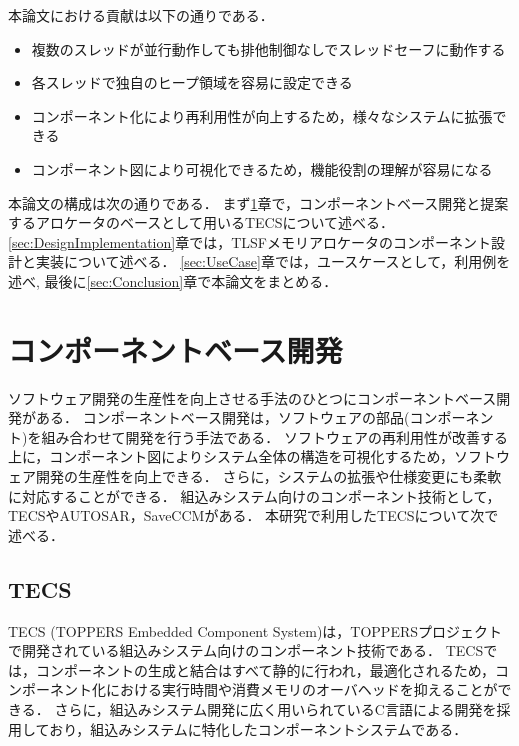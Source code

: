 \documentclass[submit,techrep]{ipsj_v2/UTF8/ipsj}
\begin{document}
本論文における貢献は以下の通りである．
\begin{itemize}
    \item 複数のスレッドが並行動作しても排他制御なしでスレッドセーフに動作する
    \item 各スレッドで独自のヒープ領域を容易に設定できる
    \item コンポーネント化により再利用性が向上するため，様々なシステムに拡張できる
    \item コンポーネント図により可視化できるため，機能役割の理解が容易になる
\end{itemize}

本論文の構成は次の通りである．
まず\ref{sec:ComponentBasedDevelopment}章で，コンポーネントベース開発と提案するアロケータのベースとして用いるTECSについて述べる．
\ref{sec:DesignImplementation}章では，TLSFメモリアロケータのコンポーネント設計と実装について述べる．
\ref{sec:UseCase}章では，ユースケースとして，利用例を述べ, 最後に\ref{sec:Conclusion}章で本論文をまとめる．

\section{コンポーネントベース開発}
\label{sec:ComponentBasedDevelopment}

ソフトウェア開発の生産性を向上させる手法のひとつにコンポーネントベース開発がある\cite{par:Crnkovic}\cite{par:CBD}．
コンポーネントベース開発は，ソフトウェアの部品(コンポーネント)を組み合わせて開発を行う手法である．
ソフトウェアの再利用性が改善する上に，コンポーネント図によりシステム全体の構造を可視化するため，ソフトウェア開発の生産性を向上できる．
さらに，システムの拡張や仕様変更にも柔軟に対応することができる．
組込みシステム向けのコンポーネント技術として，TECSやAUTOSAR\cite{url:AUTOSAR}，SaveCCM\cite{par:SaveCCM}がある．
本研究で利用したTECSについて次で述べる．

\subsection{TECS}

TECS (TOPPERS Embedded Component System)は，TOPPERSプロジェクト\cite{url:TOPPERS}で開発されている組込みシステム向けのコンポーネント技術である．
TECSでは，コンポーネントの生成と結合はすべて静的に行われ，最適化されるため，コンポーネント化における実行時間や消費メモリのオーバヘッドを抑えることができる．
さらに，組込みシステム開発に広く用いられているC言語による開発を採用しており，組込みシステムに特化したコンポーネントシステムである．
\end{document}
